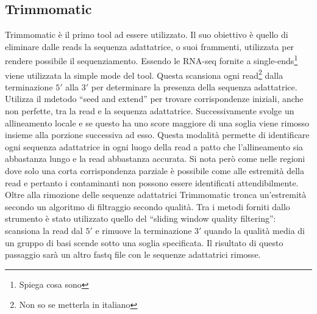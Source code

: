   	\subsection{Trimmomatic}
	Trimmomatic \cite{trimmomatic} \`e il primo tool ad essere utilizzato.
	Il suo obiettivo \`e quello di eliminare dalle reads la sequenza adattatrice, o suoi frammenti, utilizzata per rendere possibile il sequenziamento.
	Essendo le RNA-seq fornite a single-ends\footnote{Spiega cosa sono} viene utilizzata la simple mode del tool.
	Questa scansiona ogni read\footnote{Non so se metterla in italiano} dalla terminazione $5'$ alla $3'$ per determinare la presenza della sequenza adattatrice.
	Utilizza il mdetodo ``seed and extend'' per trovare corrispondenze iniziali, anche non perfette, tra la read e la sequenza adattatrice.
	Successivamente svolge un allineamento locale e se questo ha uno score maggiore di una soglia viene rimosso insieme alla porzione successiva ad esso.
	Questa modalit\`a permette di identificare ogni sequenza adattatrice in ogni luogo della read a patto che l'allineamento sia abbastanza lungo e la read abbastanza accurata.
	Si nota per\`o come nelle regioni dove solo una corta corrispondenza parziale \`e possibile come alle estremit\`a della read e pertanto i contaminanti non possono essere identificati attendibilmente.
	Oltre alla rimozione delle sequenze adattatrici Trimmomatic tronca un'estremit\`a secondo un algoritmo di filtraggio secondo qualit\`a.
	Tra i metodi forniti dallo strumento \`e stato utilizzato quello del ``sliding window quality filtering'':
	scansiona la read dal $5'$ e rimuove la terminazione $3'$ quando la qualit\`a media di un gruppo di basi scende sotto una soglia specificata.
	Il risultato di questo passaggio sar\`a un altro fastq file con le sequenze adattatrici rimosse.

